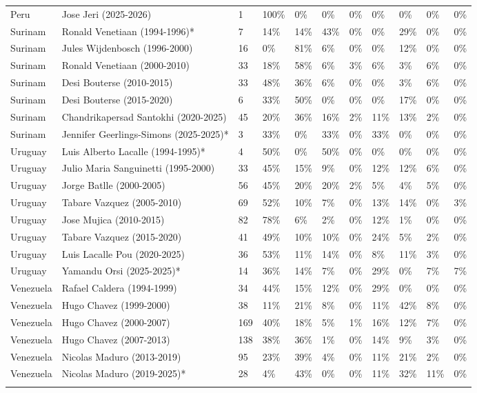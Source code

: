 \documentclass[11pt,a4paper]{article}
\begin{document}
\begin{longtable}{lllllllllll}
  Peru & Jose Jeri (2025-2026) & 1 & 100\% & 0\% & 0\% & 0\% & 0\% & 0\% & 0\% & 0\% \\ 
  Surinam & Ronald Venetiaan (1994-1996)* & 7 & 14\% & 14\% & 43\% & 0\% & 0\% & 29\% & 0\% & 0\% \\ 
  Surinam & Jules Wijdenbosch (1996-2000) & 16 & 0\% & 81\% & 6\% & 0\% & 0\% & 12\% & 0\% & 0\% \\ 
  Surinam & Ronald Venetiaan (2000-2010) & 33 & 18\% & 58\% & 6\% & 3\% & 6\% & 3\% & 6\% & 0\% \\ 
  Surinam & Desi Bouterse (2010-2015) & 33 & 48\% & 36\% & 6\% & 0\% & 0\% & 3\% & 6\% & 0\% \\ 
  Surinam & Desi Bouterse (2015-2020) & 6 & 33\% & 50\% & 0\% & 0\% & 0\% & 17\% & 0\% & 0\% \\ 
  Surinam & Chandrikapersad Santokhi (2020-2025) & 45 & 20\% & 36\% & 16\% & 2\% & 11\% & 13\% & 2\% & 0\% \\ 
  Surinam & Jennifer Geerlings-Simons (2025-2025)* & 3 & 33\% & 0\% & 33\% & 0\% & 33\% & 0\% & 0\% & 0\% \\ 
  Uruguay & Luis Alberto Lacalle (1994-1995)* & 4 & 50\% & 0\% & 50\% & 0\% & 0\% & 0\% & 0\% & 0\% \\ 
  Uruguay & Julio Maria Sanguinetti (1995-2000) & 33 & 45\% & 15\% & 9\% & 0\% & 12\% & 12\% & 6\% & 0\% \\ 
  Uruguay & Jorge Batlle (2000-2005) & 56 & 45\% & 20\% & 20\% & 2\% & 5\% & 4\% & 5\% & 0\% \\ 
  Uruguay & Tabare Vazquez (2005-2010) & 69 & 52\% & 10\% & 7\% & 0\% & 13\% & 14\% & 0\% & 3\% \\ 
  Uruguay & Jose Mujica (2010-2015) & 82 & 78\% & 6\% & 2\% & 0\% & 12\% & 1\% & 0\% & 0\% \\ 
  Uruguay & Tabare Vazquez (2015-2020) & 41 & 49\% & 10\% & 10\% & 0\% & 24\% & 5\% & 2\% & 0\% \\ 
  Uruguay & Luis Lacalle Pou (2020-2025) & 36 & 53\% & 11\% & 14\% & 0\% & 8\% & 11\% & 3\% & 0\% \\ 
  Uruguay & Yamandu Orsi (2025-2025)* & 14 & 36\% & 14\% & 7\% & 0\% & 29\% & 0\% & 7\% & 7\% \\ 
  Venezuela & Rafael Caldera (1994-1999) & 34 & 44\% & 15\% & 12\% & 0\% & 29\% & 0\% & 0\% & 0\% \\ 
  Venezuela & Hugo Chavez (1999-2000) & 38 & 11\% & 21\% & 8\% & 0\% & 11\% & 42\% & 8\% & 0\% \\ 
  Venezuela & Hugo Chavez (2000-2007) & 169 & 40\% & 18\% & 5\% & 1\% & 16\% & 12\% & 7\% & 0\% \\ 
  Venezuela & Hugo Chavez (2007-2013) & 138 & 38\% & 36\% & 1\% & 0\% & 14\% & 9\% & 3\% & 0\% \\ 
  Venezuela & Nicolas Maduro (2013-2019) & 95 & 23\% & 39\% & 4\% & 0\% & 11\% & 21\% & 2\% & 0\% \\ 
  Venezuela & Nicolas Maduro (2019-2025)* & 28 & 4\% & 43\% & 0\% & 0\% & 11\% & 32\% & 11\% & 0\% \\ 
   \hline
\hline
\label{tab:perfil-regional}
\end{longtable}
\endgroup\restoregeometry
\pdfpagewidth=21cm
\pdfpageheight=29.7cm
\clearpage
\end{document}
